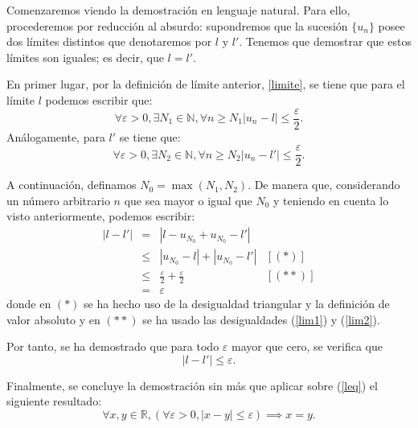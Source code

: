 \begin{demostracion}
  Comenzaremos viendo la demostración en lenguaje natural. Para ello,
  procederemos por reducción al absurdo: supondremos que la sucesión
  \(\{u_n\}\) posee dos límites distintos que denotaremos por \(l\)
  y \(l'\). Tenemos que demostrar que estos límites son iguales;
  es decir, que \(l=l'\).

  En primer lugar, por la definición de límite anterior, \ref{limite},
  se tiene que para el límite \(l\) podemos escribir que:
  \begin{equation}\label{lim1}
    ∀ ε > 0, ∃ N_1 ∈ ℕ, ∀ n ≥ N_1 |u_n-l| ≤ \frac{ε}{2}.
  \end{equation}
  Análogamente, para \(l'\) se tiene que:
  \begin{equation}\label{lim2}
    ∀ ε > 0, ∃ N_2 ∈ ℕ, ∀ n ≥ N_2 |u_n-l'| ≤ \frac{ε}{2}.
  \end{equation}

  A continuación, definamos \(N_0 = \max(N_1,N_2)\).
  De manera que, considerando un número arbitrario \(n\) que
  sea mayor o igual que \(N_0\) y teniendo en cuenta lo visto anteriormente,
  podemos escribir:
  \[\begin{array}{llll}
      |l-l'| &= &|l-u_{N_0}+u_{N_0}-l'|   & \\
             &≤ &|u_{N_0}-l|+|u_{N_0}-l'| & [(*)] \\
             &≤ &\frac{ε}{2}+\frac{ε}{2} & [(**)] \\
             &= &ε
  \end{array}\]
  donde en \((*)\) se ha hecho uso de la desigualdad triangular y la
  definición de valor absoluto y en \((**)\) se ha usado las
  desigualdades (\ref{lim1}) y (\ref{lim2}).

  Por tanto, se ha demostrado que para todo \(ε\) mayor que cero, se
  verifica que
  \begin{equation}\label{leq}
    |l-l'| ≤ ε.
  \end{equation}

  Finalmente, se concluye la demostración sin más que aplicar sobre
  (\ref{leq}) el siguiente resultado:
  \begin{equation}
    ∀ x, y ∈ ℝ, (∀ ε > 0, |x - y| ≤ ε) ⟹ x = y.
  \end{equation}
\end{demostracion}


